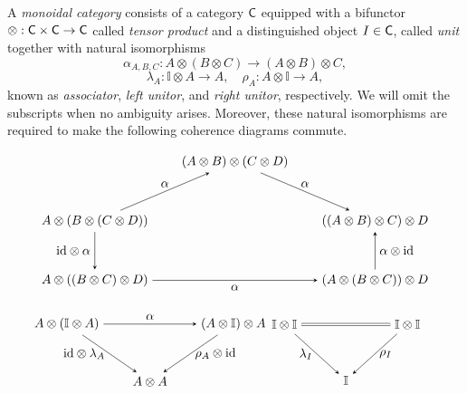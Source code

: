 \begin{definition}
 A \emph{monoidal category} consists of a category $\mathsf{C}$ equipped with a bifunctor $\otimes : \mathsf{C} \times \mathsf{C} \to \mathsf{C}$
called \emph{tensor product} and a distinguished object $I \in \mathsf{C}$, called \emph{unit} together with natural isomorphisms
\[
\alpha_{A,B,C} : A \otimes (B \otimes C) \rightarrow (A \otimes B) \otimes C,
\]
\[
\lambda_A :\mathbb{I}\otimes A \rightarrow A, \quad \rho_A : A \otimes\mathbb{I}\rightarrow A,
\]
known as \emph{associator}, \emph{left unitor}, and \emph{right unitor}, respectively. We will omit the subscripts when no ambiguity arises.
Moreover, these natural isomorphisms are required to make the following coherence diagrams commute.
\[
\begin{tikzpicture}
  \matrix (m) [matrix of math nodes,row sep=3em,column sep=2em,minimum width=1em]
  {
    & (A \otimes B) \otimes (C \otimes D) & \\
   A \otimes (B \otimes (C \otimes D)) &  & ((A \otimes B) \otimes C) \otimes D  \\
    A \otimes ((B \otimes C) \otimes D)  & &  (A \otimes (B \otimes C)) \otimes D \\
  };
  \path[-stealth]
    (m-1-2) edge  node [above] {$\alpha$} (m-2-3)
    (m-3-3) edge  node [right] {$\alpha \otimes \id$} (m-2-3)
    (m-3-1) edge  node [below] {$\alpha$} (m-3-3)
    (m-2-1) edge  node [left] {$\id \otimes \alpha$} (m-3-1)
    (m-2-1) edge  node [above] {$\alpha$} (m-1-2)
    ;
\end{tikzpicture}
\]


\[
\begin{minipage}{0.45\textwidth}
\centering
\begin{tikzpicture}
  \matrix (m) [matrix of math nodes,row sep=3em,column sep=2em,minimum width=1em]
  {
    A \otimes (\mathbb{I} \otimes A) &   & (A \otimes \mathbb{I}) \otimes A \\
     & A \otimes A & \\
  };
  \path[-stealth]
    (m-1-1) edge  node [above] {$\alpha$} (m-1-3)
    (m-1-1) edge  node [left] {$\id \otimes \lambda_A$} (m-2-2)
    (m-1-3) edge  node [right] {$\rho_A \otimes \id$} (m-2-2);
\end{tikzpicture}
\end{minipage}
\quad \quad
\begin{minipage}{0.45\textwidth}
\centering
\begin{tikzpicture}
  \matrix (m) [matrix of math nodes,row sep=3em,column sep=3em,minimum width=1em]
  {
   \mathbb{I}\otimes\mathbb{I}&   &\mathbb{I}\otimes\mathbb{I} \\
     &\mathbb{I}& \\
  };
  \path[-stealth]
    (m-1-1) edge  node [left] {$\lambda_I$} (m-2-2)
    (m-1-3) edge  node [right] {$\rho_I$} (m-2-2);
  \draw[double equal sign distance] (m-1-1) -- (m-1-3);
\end{tikzpicture}
\end{minipage}
\]

\end{definition}






